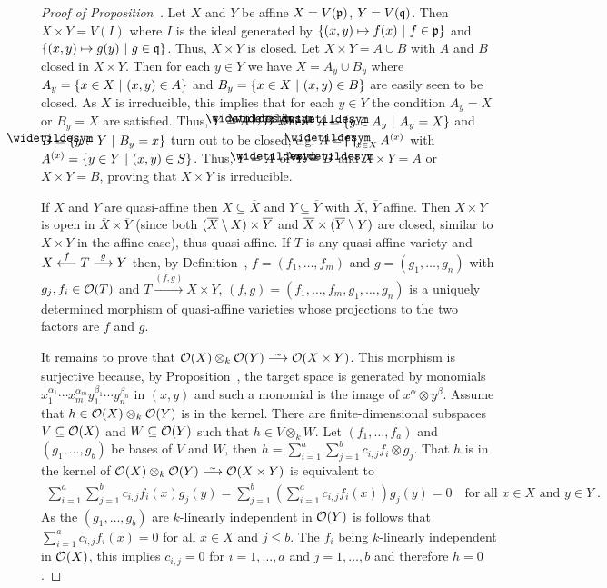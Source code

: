 \documentclass[a4paper,parskip=half,numbers=enddot, DIV=12]{scrreprt}
\renewcommand{\leq}{\leqslant}
\begin{document}
	\begin{proof}[Proof of Proposition~]
		Let $X$ and $Y$ be affine $X=V(\mathfrak{p})$, $Y=V(\mathfrak{q})$. Then $X\times Y=V(I)$ where $I$ is the ideal generated by $\left\{(x,y) \mapsto f(x)\ \middle|\  f\in \mathfrak{p}\right\}$ and $\left\{(x,y) \mapsto g(y)\ \middle|\  g\in \mathfrak{q}\right\}$. Thus, $X\times Y$ is closed. Let $X\times Y = A\cup B$ with $A$ and $B$ closed in $X\times Y$. Then for each $y\in Y$ we have $X = A_y\cup B_y$ where $A_y=\left\{ x\in X\ \middle|\  (x,y)\in A \right\}$ and $B_y = \left\{x\in X \ \middle|\  (x,y)\in B\right\}$ are easily seen to be closed. As $X$ is irreducible, this implies that for each $y\in Y$ the condition $A_y = X$ or $B_y = X$ are satisfied. Thus, $Y=\snake A\cup \snake B$ where $\snake A = \left\{ y\in A_y\st A_y=X\right\}$ and $\snake B =\left\{y\in Y\st B_y = x\right\}$ turn out to be closed, e.g. $\snake A = \bigcap_{x\in X} A^{(x)}$ with $A^{(x)} =\left\{y\in Y\ \middle|\  (x,y)\in S\right\}$. Thus, $Y= \snake A$ or $Y=\snake B$ and $X\times Y = A$ or $X\times Y = B$, proving that $X\times Y$ is irreducible. 
		
		If $X$ and $Y$ are quasi-affine then $X\subseteq \overline{X}$ and $Y\subseteq \overline{Y}$ with $\overline{X}$, $\overline{Y}$ affine. Then $X\times Y$ is open in $\overline{X}\times \overline{Y}$ (since both $(\overline X\setminus X)\times \overline Y$ and $\overline X\times (\overline Y\setminus Y)$ are closed, similar to $X\times Y$ in the affine case), thus quasi affine. If $T$ is any quasi-affine variety and $X\lmorphism[f] T\morphism[g] Y$ then, by Definition~, $f=(f_1,\ldots, f_m)$ and $g=(g_1,\ldots, g_n)$ with $g_j, f_i\in \mathcal{O}(T)$ and $T\xrightarrow{(f,g)} X\times Y$, $(f,g) = (f_1,\ldots, f_m, g_1,\ldots, g_n)$ is a uniquely determined morphism of quasi-affine varieties whose projections to the two factors are $f$ and $g$.
		
		It remains to prove that $\Oo(X)\otimes_k \Oo(Y) \isomorphism \Oo(X\times Y)$. This morphism is surjective because, by Proposition~, the target space is generated by monomials $x_1^{\alpha_1}\cdots x_m^{\alpha_m} y_1^{\beta_1}\cdots y_n^{\beta_n}$ in $(x,y)$ and such a monomial is the image of $x^\alpha\otimes y^\beta$. Assume that $h\in \mathcal{O}(X)\otimes_k \mathcal{O}(Y)$ is in the kernel. There are finite-dimensional subspaces $V\subseteq \mathcal{O}(X)$ and $W\subseteq \mathcal{O}(Y)$ such that $h\in V\otimes_k W$. Let $(f_1,\ldots,f_a)$ and $(g_1,\ldots,g_b)$ be bases of $V$ and $W$, then $h = \sum_{i=1}^a\sum_{j=1}^b c_{i,j}f_i\otimes g_j$. That $h$ is in the kernel of $\Oo(X)\otimes_k\Oo(Y) \isomorphism \Oo(X\times Y)$ is equivalent to
		\begin{align*}
			\sum_{i=1}^a\sum_{j=1}^b c_{i,j}f_i(x) g_j(y) = \sum_{j=1}^b\left(\sum_{i=1}^a c_{i,j}f_i(x)\right) g_j(y) =0\quad\text{for all }x\in X\text{ and }y\in Y\;.
		\end{align*}
		As the $(g_1,\ldots,g_b)$ are $k$-linearly independent in $\mathcal{O}(Y)$ is follows that $\sum_{i=1}^a c_{i,j}f_i(x) = 0$ for all $x\in X$ and $j\leq b$. The $f_i$ being $k$-linearly independent in $\mathcal{O}(X)$, this implies $c_{i,j}=0$ for $i=1,\ldots,a$ and $j =1,\ldots,b$ and therefore $h=0$.
	\end{proof}
\end{document}
